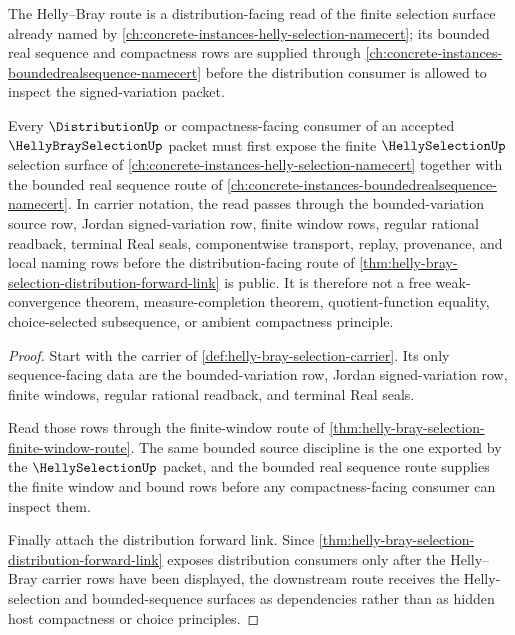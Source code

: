 The Helly--Bray route is a distribution-facing read of the finite selection surface already named by \autoref{ch:concrete-instances-helly-selection-namecert}; its bounded real sequence and compactness rows are supplied through \autoref{ch:concrete-instances-boundedrealsequence-namecert} before the distribution consumer is allowed to inspect the signed-variation packet.

\begin{theorem}
\label{thm:helly-bray-selection-helly-selection-dependency-route}
Every $\DistributionUp$ or compactness-facing consumer of an accepted $\HellyBraySelectionUp$ packet must first expose the finite $\HellySelectionUp$ selection surface of \autoref{ch:concrete-instances-helly-selection-namecert} together with the bounded real sequence route of \autoref{ch:concrete-instances-boundedrealsequence-namecert}. In carrier notation, the read passes through the bounded-variation source row, Jordan signed-variation row, finite window rows, regular rational readback, terminal Real seals, componentwise transport, replay, provenance, and local naming rows before the distribution-facing route of \autoref{thm:helly-bray-selection-distribution-forward-link} is public. It is therefore not a free weak-convergence theorem, measure-completion theorem, quotient-function equality, choice-selected subsequence, or ambient compactness principle.
\end{theorem}
\begin{proof}
Start with the carrier of \autoref{def:helly-bray-selection-carrier}. Its only sequence-facing data are the bounded-variation row, Jordan signed-variation row, finite windows, regular rational readback, and terminal Real seals.

Read those rows through the finite-window route of \autoref{thm:helly-bray-selection-finite-window-route}. The same bounded source discipline is the one exported by the $\HellySelectionUp$ packet, and the bounded real sequence route supplies the finite window and bound rows before any compactness-facing consumer can inspect them.

Finally attach the distribution forward link. Since \autoref{thm:helly-bray-selection-distribution-forward-link} exposes distribution consumers only after the Helly--Bray carrier rows have been displayed, the downstream route receives the Helly-selection and bounded-sequence surfaces as dependencies rather than as hidden host compactness or choice principles.
\end{proof}
